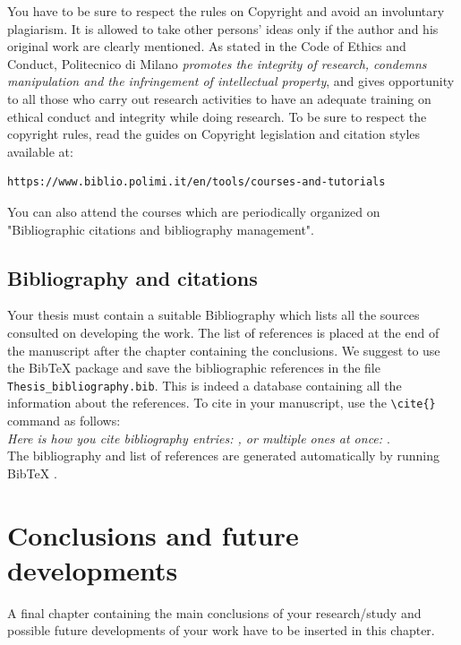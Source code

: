 \documentclass{report}
\begin{document}
You have to be sure to respect the rules on Copyright and avoid an involuntary plagiarism.
It is allowed to take other persons' ideas only if the author and his original work are clearly mentioned.
As stated in the Code of Ethics and Conduct, Politecnico di Milano \textit{promotes the integrity of research,
condemns manipulation and the infringement of intellectual property}, and gives opportunity to all those
who carry out research activities to have an adequate training on ethical conduct and integrity while doing research.
To be sure to respect the copyright rules, read the guides on Copyright legislation and citation styles available
at:
\begin{verbatim}
https://www.biblio.polimi.it/en/tools/courses-and-tutorials
\end{verbatim}
You can also attend the courses which are periodically organized on "Bibliographic citations and bibliography management".

\section{Bibliography and citations}
Your thesis must contain a suitable Bibliography which lists all the sources consulted on developing the work.
The list of references is placed at the end of the manuscript after the chapter containing the conclusions.
We suggest to use the BibTeX package and save the bibliographic references  in the file \verb|Thesis_bibliography.bib|.
This is indeed a database containing all the information about the references. To cite in your manuscript, use the \verb|\cite{}| command as follows:
\\
\textit{Here is how you cite bibliography entries: \cite{knuth74}, or multiple ones at once: \cite{knuth92,lamport94}}.
\\
The bibliography and list of references are generated automatically by running BibTeX \cite{bibtex}.

\chapter{Conclusions and future developments}
\label{ch:conclusions}%
A final chapter containing the main conclusions of your research/study
and possible future developments of your work have to be inserted in this chapter.

\end{document}
